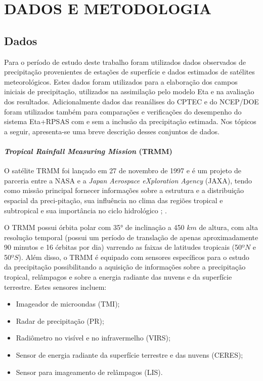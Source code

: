 \hypertarget{estilo:capitulo}{}
\chapter{DADOS E METODOLOGIA}
\label{ss:cap2}

\section{Dados}
\label{ss:dados}
    
Para o período de estudo deste trabalho foram utilizados dados observados de precipitação provenientes de estações de superfície e dados estimados de satélites meteorológicos. Estes dados foram utilizados para a elaboração dos campos iniciais de precipitação, utilizados na assimilação pelo modelo Eta e na avaliação dos resultados. Adicionalmente dados das reanálises do CPTEC e do NCEP/DOE foram utilizados também para comparações e verificações do desempenho do sistema Eta+RPSAS com e sem a inclusão da precipitação estimada. Nos tópicos a seguir, apresenta-se uma breve descrição desses conjuntos de dados.

\subsubsection{\textit{Tropical Rainfall Measuring Mission} (TRMM)}

O satélite TRMM foi lançado em 27 de novembro de 1997 e é um projeto de parceria entre a NASA e a \textit{Japan Aerospace eXploration Agency} (JAXA), tendo como missão principal  fornecer informações sobre a estrutura e a distribuição espacial da preci-pitação, sua influência no clima das regiões tropical e subtropical e sua importância no ciclo hidrológico \cite{simpsonetal88}; \cite{simpsonetal96}.

O TRMM possui órbita polar com 35° de inclinação a 450 $km$ de altura, com alta resolução temporal (possui um período de translação de apenas aproximadamente 90 minutos e 16 órbitas por dia) varrendo as faixas de latitudes tropicais (50$ºN$ e 50$ºS$). Além disso, o TRMM é equipado com sensores específicos para o estudo da precipitação possibilitando a aquisição de informações sobre a precipitação tropical, relâmpagos e sobre a energia radiante das nuvens e da superfície terrestre. Estes sensores incluem:

\begin{itemize}
\item Imageador de microondas (TMI);
\item Radar de precipitação (PR);
\item Radiômetro no visível e no infravermelho (VIRS);
\item Sensor de energia radiante da superfície terrestre e das nuvens (CERES);
\item Sensor para imageamento de relâmpagos (LIS).
\end{itemize}

